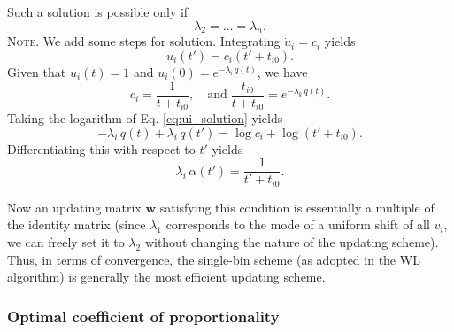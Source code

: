 \documentclass[reprint]{revtex4-1}
\newcommand{\note}[1]{{\color{DarkGreen}\footnotesize \textsc{Note.} #1}}
\begin{document}
Such a solution is possible only if
\begin{equation}
\lambda_2 = \dots = \lambda_n.
\end{equation}
%
\note{
  We add some steps for solution.
  Integrating $\dot u_i = c_i$ yields
  \begin{equation}
  u_i(t') = c_i \left(t' + t_{i0} \right).
  \label{eq:ui_solution}
  \end{equation}
  Given that $u_i(t) = 1$ and $u_i(0) = e^{-\lambda_i \, q(t)}$,
  we have
  $$
  c_i = \frac{ 1 }{ t + t_{i0} },
  \quad
  \mathrm{and\;}
  \frac{ t_{i0} } { t + t_{i0} }
  =
  e^{ -\lambda_k \, q(t) }.
  $$
  Taking the logarithm of Eq. \eqref{eq:ui_solution} yields
  $$
  -\lambda_i \, q(t) + \lambda_i \, q(t')
  = \log c_i + \log\left( t' + t_{i0} \right).
  $$
  Differentiating this with respect to $t'$ yields
  $$
  \lambda_i \, \alpha(t') = \frac{ 1 } { t' + t_{i0} }.
  $$
}

Now an updating matrix $\mathbf w$ satisfying this condition
is essentially a multiple of the identity matrix
(since $\lambda_1$ corresponds to the mode
of a uniform shift of all $v_i$,
we can freely set it to $\lambda_2$
without changing the nature of the updating scheme).
%
Thus, in terms of convergence,
the single-bin scheme
(as adopted in the WL algorithm)
is generally the most efficient
updating scheme.




\subsubsection{Optimal coefficient of proportionality}
\end{document}
